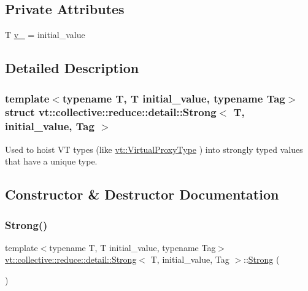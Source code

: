 \subsection*{Private Attributes}
\begin{DoxyCompactItemize}
\item 
T \hyperlink{structvt_1_1collective_1_1reduce_1_1detail_1_1_strong_a1952e524a596e85011084327aacff707}{v\+\_\+} = initial\+\_\+value
\end{DoxyCompactItemize}


\subsection{Detailed Description}
\subsubsection*{template$<$typename T, T initial\+\_\+value, typename Tag$>$\newline
struct vt\+::collective\+::reduce\+::detail\+::\+Strong$<$ T, initial\+\_\+value, Tag $>$}

Used to hoist VT types (like {\ttfamily \hyperlink{namespacevt_a1b417dd5d684f045bb58a0ede70045ac}{vt\+::\+Virtual\+Proxy\+Type}} ) into strongly typed values that have a unique type. 



\subsection{Constructor \& Destructor Documentation}
\mbox{\label{structvt_1_1collective_1_1reduce_1_1detail_1_1_strong_af1121c0e63f347e779f1cad333792056}} 
\subsubsection{\texorpdfstring{Strong()}{Strong()}\hspace{0.1cm}{\footnotesize\ttfamily [1/2]}}
{\footnotesize\ttfamily template$<$typename T, T initial\+\_\+value, typename Tag$>$ \\
\hyperlink{structvt_1_1collective_1_1reduce_1_1detail_1_1_strong}{vt\+::collective\+::reduce\+::detail\+::\+Strong}$<$ T, initial\+\_\+value, Tag $>$\+::\hyperlink{structvt_1_1collective_1_1reduce_1_1detail_1_1_strong}{Strong} (\begin{DoxyParamCaption}{ }\end{DoxyParamCaption})\hspace{0.3cm}{\ttfamily [default]}}

